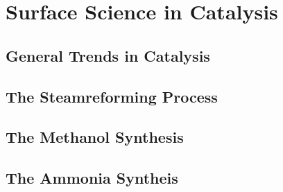 \newpage
\chapter{Surface Science in Catalysis}
\section{General Trends in Catalysis}
\section{The Steamreforming Process}
\section{The Methanol Synthesis}
\section{The Ammonia Syntheis}
